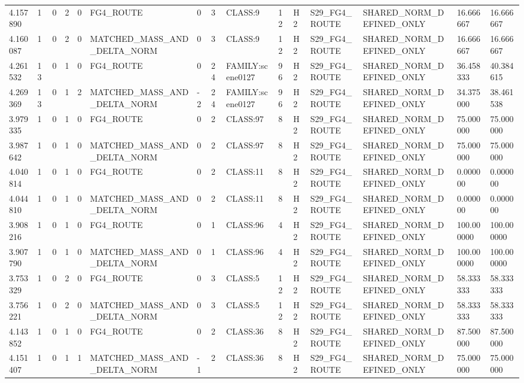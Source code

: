 \begin{tabular}{lllllllllllllll}
4.157890 & 1 & 0 & 2 & 0 & FG4\_ROUTE & 0 & 3 & CLASS:9 & 12 & H2 & S29\_FG4\_ROUTE & SHARED\_NORM\_DEFINED\_ONLY & 16.666667 & 16.666667 \\
4.160087 & 1 & 0 & 2 & 0 & MATCHED\_MASS\_AND\_DELTA\_NORM & 0 & 3 & CLASS:9 & 12 & H2 & S29\_FG4\_ROUTE & SHARED\_NORM\_DEFINED\_ONLY & 16.666667 & 16.666667 \\
4.261532 & 13 & 0 & 1 & 0 & FG4\_ROUTE & 0 & 24 & FAMILY:scene0127 & 96 & H2 & S29\_FG4\_ROUTE & SHARED\_NORM\_DEFINED\_ONLY & 36.458333 & 40.384615 \\
4.269369 & 13 & 0 & 1 & 2 & MATCHED\_MASS\_AND\_DELTA\_NORM & -2 & 24 & FAMILY:scene0127 & 96 & H2 & S29\_FG4\_ROUTE & SHARED\_NORM\_DEFINED\_ONLY & 34.375000 & 38.461538 \\
3.979335 & 1 & 0 & 1 & 0 & FG4\_ROUTE & 0 & 2 & CLASS:97 & 8 & H2 & S29\_FG4\_ROUTE & SHARED\_NORM\_DEFINED\_ONLY & 75.000000 & 75.000000 \\
3.987642 & 1 & 0 & 1 & 0 & MATCHED\_MASS\_AND\_DELTA\_NORM & 0 & 2 & CLASS:97 & 8 & H2 & S29\_FG4\_ROUTE & SHARED\_NORM\_DEFINED\_ONLY & 75.000000 & 75.000000 \\
4.040814 & 1 & 0 & 1 & 0 & FG4\_ROUTE & 0 & 2 & CLASS:11 & 8 & H2 & S29\_FG4\_ROUTE & SHARED\_NORM\_DEFINED\_ONLY & 0.000000 & 0.000000 \\
4.044810 & 1 & 0 & 1 & 0 & MATCHED\_MASS\_AND\_DELTA\_NORM & 0 & 2 & CLASS:11 & 8 & H2 & S29\_FG4\_ROUTE & SHARED\_NORM\_DEFINED\_ONLY & 0.000000 & 0.000000 \\
3.908216 & 1 & 0 & 1 & 0 & FG4\_ROUTE & 0 & 1 & CLASS:96 & 4 & H2 & S29\_FG4\_ROUTE & SHARED\_NORM\_DEFINED\_ONLY & 100.000000 & 100.000000 \\
3.907790 & 1 & 0 & 1 & 0 & MATCHED\_MASS\_AND\_DELTA\_NORM & 0 & 1 & CLASS:96 & 4 & H2 & S29\_FG4\_ROUTE & SHARED\_NORM\_DEFINED\_ONLY & 100.000000 & 100.000000 \\
3.753329 & 1 & 0 & 2 & 0 & FG4\_ROUTE & 0 & 3 & CLASS:5 & 12 & H2 & S29\_FG4\_ROUTE & SHARED\_NORM\_DEFINED\_ONLY & 58.333333 & 58.333333 \\
3.756221 & 1 & 0 & 2 & 0 & MATCHED\_MASS\_AND\_DELTA\_NORM & 0 & 3 & CLASS:5 & 12 & H2 & S29\_FG4\_ROUTE & SHARED\_NORM\_DEFINED\_ONLY & 58.333333 & 58.333333 \\
4.143852 & 1 & 0 & 1 & 0 & FG4\_ROUTE & 0 & 2 & CLASS:36 & 8 & H2 & S29\_FG4\_ROUTE & SHARED\_NORM\_DEFINED\_ONLY & 87.500000 & 87.500000 \\
4.151407 & 1 & 0 & 1 & 1 & MATCHED\_MASS\_AND\_DELTA\_NORM & -1 & 2 & CLASS:36 & 8 & H2 & S29\_FG4\_ROUTE & SHARED\_NORM\_DEFINED\_ONLY & 75.000000 & 75.000000 \\

\end{tabular}
